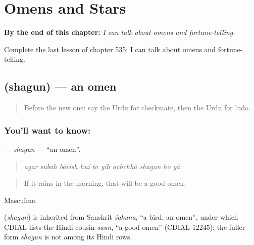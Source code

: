 
\chapter{Omens and Stars}
\label{ch:ur-omens-and-stars}

\begin{chapteropening}
\textbf{By the end of this chapter:} \emph{I can talk about omens and fortune-telling.}

Complete the last lesson of chapter 535: I can talk about omens and fortune-telling.
\end{chapteropening}

\section[\texorpdfstring{\ur{شگون} (shagun)}{شگون (shagun)}]{ (shagun) — an omen}

\label{lesson:UR-C535-shagun}



\begin{quote}
Before the new one: say the Urdu for checkmate, then the Urdu for ludo.
\end{quote}

\subsection*{You'll want to know: }
\textbf{} — \emph{shagun} — \textquotedblleft{}an omen\textquotedblright{}.

\begin{quote}
         
\end{quote}

\begin{quote}
\emph{agar subah bārish huī to yih achchhā shagun ho gā.}
\end{quote}

\begin{quote}
If it rains in the morning, that will be a good omen.
\end{quote}

Masculine.

\begin{cousinweb}
\textbf{} (\emph{shagun}) is inherited from Sanskrit \emph{śakuna}, \textquotedblleft{}a bird; an omen\textquotedblright{}, under which CDIAL lists the Hindi cousin \emph{saun}, \textquotedblleft{}a good omen\textquotedblright{} (CDIAL 12245); the fuller form \emph{shagun} is not among its Hindi rows.
\end{cousinweb}

